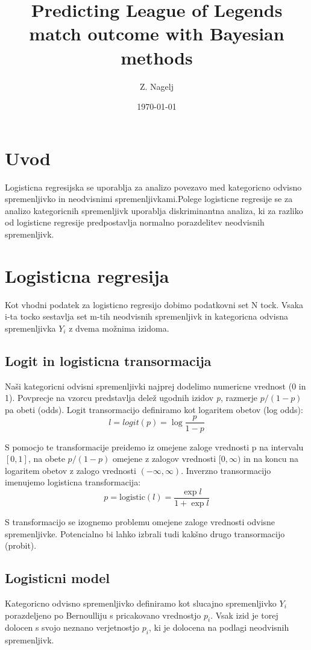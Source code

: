 \documentclass[letterpaper,11pt]{article}
\begin{document}



\title{\Large{Predicting League of Legends match outcome with Bayesian methods}}
\author{Z. Nagelj}
\date{\today}
\maketitle


\section{Uvod}
Logisticna regresijska se uporablja za analizo povezavo med kategoricno odvisno spremenljivko in neodvisnimi  spremenljivkami.Polege logisticne regresije se za analizo kategoricnih spremenljivk uporablja diskriminantna analiza, ki za razliko od logisticne regresije predpostavlja normalno porazdelitev neodvisnih spremenljivk.


\section{Logisticna regresija}
Kot vhodni podatek za logisticno regresijo dobimo podatkovni set N tock. Vsaka i-ta tocko sestavlja set m-tih neodvisnih spremenljivk in kategoricna odvisna spremenljivka $Y_i$ z dvema možnima izidoma.


\subsection{Logit in logisticna transormacija}
Naši kategoricni odvisni spremenljivki najprej dodelimo numericne vrednost (0 in 1). Povprecje na vzorcu predstavlja delež ugodnih izidov \emph{p}, razmerje $p/(1-p)$ pa obeti (odds). Logit transormacijo  definiramo kot logaritem obetov (log odds):
$$l = logit(p) = \log{\frac{p}{1-p}} $$

\noindent S pomocjo te transformacije preidemo iz omejene zaloge vrednosti p na intervalu $[0,1]$, na obete $p/(1-p)$ omejene z zalogov vrednosti $[0, \infty)$ in na koncu na logaritem obetov z zalogo vrednosti $(-\infty, \infty)$. Inverzno transormacijo imenujemo logisticna transformacija:
$$p = \text{logistic}(l)=\frac{\exp{l}}{1 + \exp{l}}$$

\noindent S transformacijo se izognemo problemu omejene zaloge vrednosti odvisne spremenljivke. Potencialno bi lahko izbrali tudi kakšno drugo transormacijo (probit).

\subsection{Logisticni model}
Kategoricno odvisno spremenljivko definiramo kot slucajno spremenljivko $Y_i$porazdeljeno po Bernoulliju s pricakovano vrednostjo $p_i$. Vsak izid je torej dolocen s svojo neznano verjetnostjo $p_i$, ki je dolocena na podlagi neodvisnih spremenljivk.
\newpage
\end{document}
